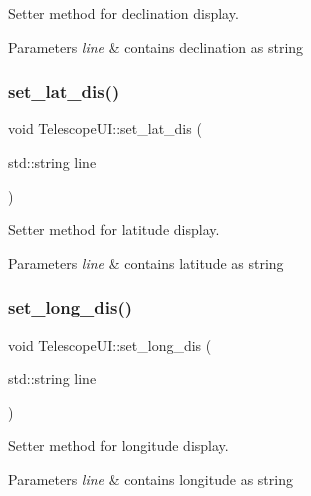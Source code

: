 Setter method for declination display. 


\begin{DoxyParams}{Parameters}
{\em line} & contains declination as string \\
\hline
\end{DoxyParams}
\mbox{\label{classTelescopeUI_aaf63d404f0d3ca0aaa53d8319255ac32}} 
\subsubsection{\texorpdfstring{set\+\_\+lat\+\_\+dis()}{set\_lat\_dis()}}
{\footnotesize\ttfamily void Telescope\+U\+I\+::set\+\_\+lat\+\_\+dis (\begin{DoxyParamCaption}\item[{std\+::string}]{line }\end{DoxyParamCaption})}



Setter method for latitude display. 


\begin{DoxyParams}{Parameters}
{\em line} & contains latitude as string \\
\hline
\end{DoxyParams}
\mbox{\label{classTelescopeUI_a17bbaf5bd8d520f6db7ccff5d20e2b15}} 
\subsubsection{\texorpdfstring{set\+\_\+long\+\_\+dis()}{set\_long\_dis()}}
{\footnotesize\ttfamily void Telescope\+U\+I\+::set\+\_\+long\+\_\+dis (\begin{DoxyParamCaption}\item[{std\+::string}]{line }\end{DoxyParamCaption})}



Setter method for longitude display. 


\begin{DoxyParams}{Parameters}
{\em line} & contains longitude as string \\
\hline
\end{DoxyParams}
\mbox{\label{classTelescopeUI_ae2e354a53baf9ad21263e0123b47785a}} 
